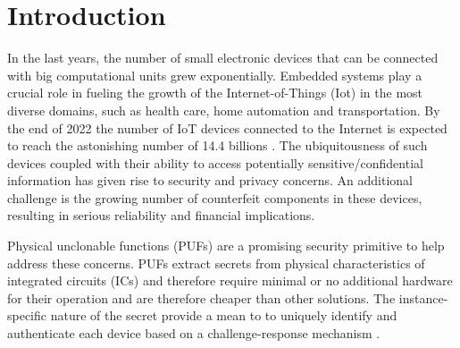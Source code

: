 \chapter{Introduction}


In the last years, the number of small electronic devices that can be connected with big computational units grew exponentially. Embedded systems play a crucial role in fueling the growth of the Internet-of-Things (Iot) in the most diverse domains, such as health care, home automation and transportation. By the end of 2022 the number of IoT devices connected to the Internet is expected to reach the astonishing number of 14.4 billions \cite{IoT_state}. The ubiquitousness of such devices coupled with their ability to access potentially sensitive/confidential information has given rise to security and privacy concerns. An additional challenge is the growing number of counterfeit
components in these devices, resulting in serious reliability and financial implications.

Physical unclonable functions (PUFs) are a promising security primitive to help address these concerns.  PUFs extract secrets from physical characteristics of integrated circuits (ICs)  \cite{PUF_IEEE_Herder} and therefore require minimal or no additional hardware for their operation and are therefore cheaper than other solutions. The instance-specific nature of the secret provide a mean to to uniquely identify and authenticate each device based on a challenge-response mechanism \cite{PUF_Sutar}.


